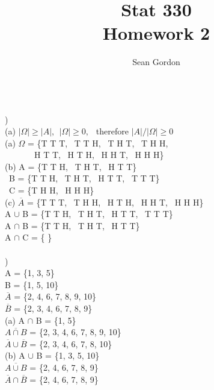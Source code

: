 \documentclass[12pt]{article}
\title{Stat 330\\Homework 2}
\author{Sean Gordon}
\begin{document}
\maketitle


\hrulefill \\


)\\
\indent (a) $|\Omega| \ge |A|,\ \ |\Omega| \ge 0,\ \ $ therefore $ |A| / |\Omega| \ge 0$\\
\indent (a) $\Omega$ = \{T T T, \ T T H, \ T H T, \ T H H,\\ \ \ \
\indent \indent \indent \ \ \ \ H T T, \ H T H, \ H H T, \ H H H\}\\

(b) A = \{T T H, \ T H T, \ H T T\}\\
\indent \indent \ B = \{T T H, \ T H T, \ H T T, \ T T T\}\\
\indent \indent \ C = \{T H H, \ H H H\}\\

(c) $\overline{A}$ = \{T T T, \ T H H, \ H T H, \ H H T, \ H H H\}\\
\indent \indent A $\cup$ B = \{T T H, \ T H T, \ H T T, \ T T T\}\\
\indent \indent A $\cap$ B = \{T T H, \ T H T, \ H T T\}\\
\indent \indent A $\cap$ C = \{ \}\\


\hrulefill \\


)\\
\indent \indent A = \{1, 3, 5\}\\
\indent \indent B = \{1, 5, 10\}\\
\indent \indent $\overline{A}$ = \{2, 4, 6, 7, 8, 9, 10\}\\
\indent \indent $\overline{B}$ = \{2, 3, 4, 6, 7, 8, 9\}\\

(a) A $\cap$ B = \{1, 5\}\\
\indent \indent $\overline{A \cap B}$ = \{2, 3, 4, 6, 7, 8, 9, 10\}\\
\indent \indent $\overline{A} \cup \overline{B}$ = \{2, 3, 4, 6, 7, 8, 10\}\\

(b) A $\cup$ B = \{1, 3, 5, 10\}\\
\indent \indent $\overline{A \cup B}$ = \{2, 4, 6, 7, 8, 9\}\\
\indent \indent $\overline{A} \cap \overline{B}$ = \{2, 4, 6, 7, 8, 9\}\\
\end{document}
